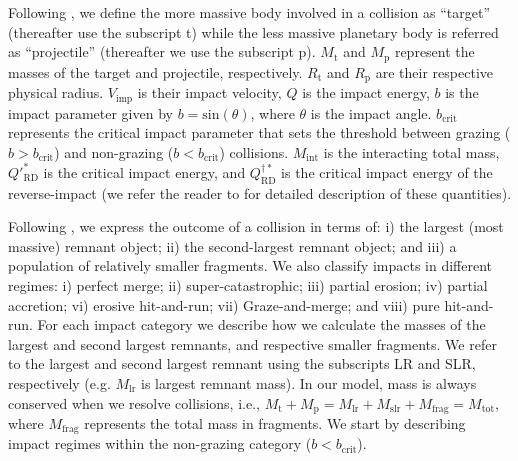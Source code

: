 \documentclass[fleqn,usenatbib]{mnras}
\begin{document}
Following \cite{leinhardt2012}, we define the more massive body involved in a collision as ``target'' (thereafter use the subscript t) while the less massive planetary body is referred as  ``projectile'' (thereafter we use the subscript p). $M_{\text{t}}$ and $M_{\text{p}}$ represent the masses of the target and projectile, respectively. $R_{\text{t}}$ and $R_{\text{p}}$ are their respective physical radius. $V_{\text{imp}}$ is their impact velocity, $Q$ is the impact energy, $b$ is the impact parameter given by $b = \textrm{sin}(\theta )$, where $\theta$ is the impact angle. $b_{\text{crit}}$ represents the critical impact parameter that sets the threshold between grazing ($b > b_{\text{crit}}$) and non-grazing ($b < b_{\text{crit}}$) collisions. $M_{\text{int}}$ is the interacting total mass, $Q'^*_{\text{RD}}$ is the critical impact energy, and $Q^{\dagger*}_{\text{RD}}$ is the critical impact energy of the reverse-impact (we refer the reader to \cite{leinhardt2012} for detailed description of these quantities).

Following \cite{leinhardt2012}, we express the outcome of a collision in terms of: i) the largest (most massive) remnant object; ii) the second-largest remnant object; and iii) a population of relatively smaller fragments. We also classify impacts in different regimes: i) perfect merge; ii) super-catastrophic; iii) partial erosion; iv) partial accretion; vi) erosive hit-and-run; vii) Graze-and-merge; and viii) pure hit-and-run. For each impact category we describe how we calculate the masses of the largest and second largest remnants, and respective  smaller fragments. We refer to the largest and second largest remnant using the subscripts $\text{LR}$ and SLR, respectively (e.g. $M_{\text{lr}}$ is largest remnant mass). In our model, mass is always conserved when we resolve collisions, i.e., $M_{\text{t}}+M_{\text{p}}=M_{\text{lr}}+M_{\text{slr}}+M_{\text{frag}}=M_{\text{tot}}$, where $M_{\text{frag}}$ represents the total mass in fragments. We start by describing impact regimes within the non-grazing category ($b < b_{\text{crit}}$). 
\end{document}
